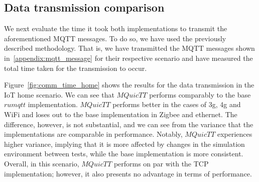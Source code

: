 \subsection{Data transmission comparison}

We next evaluate the time it took both implementations to transmit the aforementioned MQTT messages.
To do so, we have used the previously described methodology.
That is, we have transmitted the MQTT messages shown in~\ref{appendix:mqtt_message} for their respective scenario and have measured the total time taken for the transmission to occur.

Figure~\ref{fig:comm_time_home} shows the results for the data transmission in the IoT home scenario.
We can see that $MQuicTT$ performs comparably to the base $rumqtt$ implementation.
$MQuicTT$ performs better in the cases of 3g, 4g and WiFi and loses out to the base implementation in Zigbee and ethernet.
The difference, however, is not substantial, and we can see from the variance that the implementations are comparable in performance.
Notably, $MQuicTT$ experiences higher variance, implying that it is more affected by changes in the simulation environment between tests, while the base implementation is more consistent.
Overall, in this scenario, $MQuicTT$ performs on par with the TCP implementation; however, it also presents no advantage in terms of performance.

